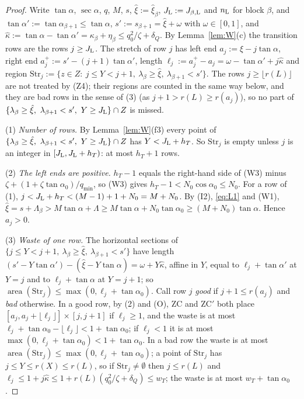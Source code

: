 \documentclass[11pt]{amsart}
\newcommand{\ta}{\tan\alpha}
\newcommand{\se}{\sec\alpha}
\newcommand{\caz}{\cos\alpha_0}
\newcommand{\taz}{\tan\alpha_0}
\theoremstyle{definition}
\theoremstyle{remark}
\numberwithin{equation}{section}
\begin{document}
\begin{proof}
Write $\ta$, $\se$, $q$, $M$, $s$, $\hat\xi:=\hat\xi_\beta$, $J_{\rm L}:=J_{\beta,\rm L}$ and $n_{\rm L}$ for block $\beta$, and
$\ta':=\tan\alpha_{\beta+1}\le\ta$, $s':=s_{\beta+1}=\hat\xi+\omega$ with $\omega\in[0,1]$, and
$\hat\kappa:=\ta-\ta'=\kappa_\beta+\eta_\beta\le q_0^2/\zeta+\delta_Q$. By Lemma~\ref{lem:W}(c) the transition rows are
the rows $j\ge J_{\rm L}$. The stretch of row $j$ has left end $a_j:=\hat\xi-j\ta$, right end $a_j^+:=s'-(j+1)\ta'$,
length $\ell_j:=a_j^+-a_j=\omega-\ta'+j\hat\kappa$ and region
$\mathrm{Str}_j:=\{z\in Z:\ j\le Y<j+1,\ \lambda_\beta\ge\hat\xi,\ \lambda_{\beta+1}<s'\}$. The rows $j\ge\lfloor r(L)\rfloor$
are not treated by (Z4); their regions are counted in the same way below, and they are bad rows in the sense of (3)
(as $j+1>r(L)\ge r(a_j)$), so no part of $\{\lambda_\beta\ge\hat\xi,\ \lambda_{\beta+1}<s',\ Y\ge J_{\rm L}\}\cap Z$ is missed.

(1) \emph{Number of rows.} By Lemma~\ref{lem:W}(f3) every point of
$\{\lambda_\beta\ge\hat\xi,\ \lambda_{\beta+1}<s',\ Y\ge J_{\rm L}\}\cap Z$ has $Y<J_{\rm L}+h_T$. So $\mathrm{Str}_j$ is
empty unless $j$ is an integer in $[J_{\rm L},J_{\rm L}+h_T)$: at most $h_T+1$ rows.

(2) \emph{The left ends are positive.} $h_T-1$ equals the right-hand side of (W3) minus $\zeta+(1+\zeta\taz)/q_{\min}$, so
(W3) gives $h_T-1<N_0\caz\le N_0$. For a row of (1), $j<J_{\rm L}+h_T<(M-1)+1+N_0=M+N_0$. By (I2), \eqref{eq:L1} and (W1),
$\hat\xi=s+\Lambda_\beta>M\ta+\Lambda\ge M\ta+N_0\taz\ge(M+N_0)\ta$. Hence $a_j>0$.

(3) \emph{Waste of one row.} The horizontal sections of $\{j\le Y<j+1,\ \lambda_\beta\ge\hat\xi,\ \lambda_{\beta+1}<s'\}$
have length $(s'-Y\ta')-(\hat\xi-Y\ta)=\omega+Y\hat\kappa$, affine in $Y$, equal to $\ell_j+\ta'$ at $Y=j$ and to
$\ell_j+\ta$ at $Y=j+1$; so $\operatorname{area}(\mathrm{Str}_j)\le\max(0,\ell_j+\taz)$. Call row $j$ \emph{good} if
$j+1\le r(a_j)$ and \emph{bad} otherwise. In a good row, by (2) and (O), ZC and ZC$'$ both place
$[a_j,a_j+\lfloor\ell_j\rfloor]\times[j,j+1]$ if $\ell_j\ge1$, and the waste is at most
$\ell_j+\taz-\lfloor\ell_j\rfloor<1+\taz$; if $\ell_j<1$ it is at most $\max(0,\ell_j+\taz)<1+\taz$. In a bad row the waste
is at most $\operatorname{area}(\mathrm{Str}_j)\le\max(0,\ell_j+\taz)$; a point of $\mathrm{Str}_j$ has
$j\le Y\le r(X)\le r(L)$, so if $\mathrm{Str}_j\ne\emptyset$ then $j\le r(L)$ and
$\ell_j\le1+j\hat\kappa\le1+r(L)(q_0^2/\zeta+\delta_Q)\le w_T$; the waste is at most $w_T+\taz$.


\end{proof}
\end{document}
